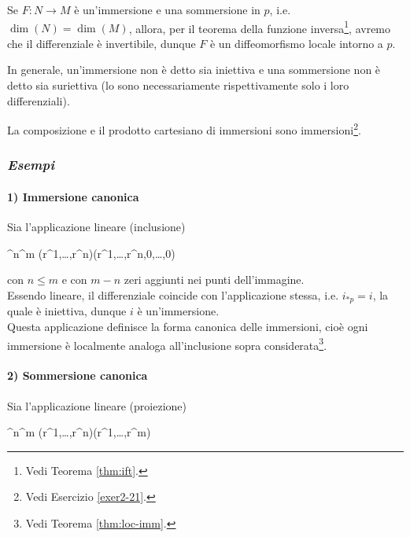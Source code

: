 \begin{remark}
	Se $ F : N \to M $ è un'immersione e una sommersione in $ p $, i.e. $ \dim(N) = \dim(M) $, allora, per il teorema della funzione inversa\footnote{%
		Vedi Teorema \ref{thm:ift}.%
	}, avremo che il differenziale è invertibile, dunque $ F $ è un diffeomorfismo locale intorno a $ p $.
\end{remark}

\begin{remark}
	In generale, un'immersione non è detto sia iniettiva e una sommersione non è detto sia suriettiva (lo sono necessariamente rispettivamente solo i loro differenziali).
\end{remark}

\begin{remark}
	La composizione e il prodotto cartesiano di immersioni sono immersioni\footnote{%
		Vedi Esercizio \ref{exer2-21}.%
	}.
\end{remark}

\subsubsection{\textit{Esempi}}

\paragraph{1) Immersione canonica}

Sia l'applicazione lineare (inclusione)

	{\R^{n}}{\R^{m}}
	{(r^{1},\dots,r^{n})}{(r^{1},\dots,r^{n},0,\dots,0)}

con $ n \leqslant m $ e con $ m-n $ zeri aggiunti nei punti dell'immagine. \\
Essendo lineare, il differenziale coincide con l'applicazione stessa, i.e. $ i_{*p} = i $, la quale è iniettiva, dunque $ i $ è un'immersione. \\
Questa applicazione definisce la forma canonica delle immersioni, cioè ogni immersione è localmente analoga all'inclusione sopra considerata\footnote{%
	Vedi Teorema \ref{thm:loc-imm}.%
}.

\paragraph{2) Sommersione canonica}

Sia l'applicazione lineare (proiezione)

\map{\pi}
	{\R^{n}}{\R^{m}}
	{(r^{1},\dots,r^{n})}{(r^{1},\dots,r^{m})}

